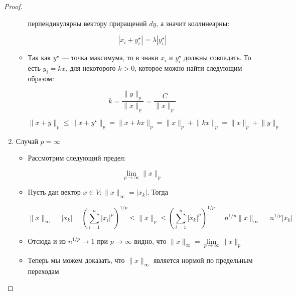\begin{proof}
\begin{enumerate}
\begin{itemize}
                перпендикулярны вектору приращений $dy$, а значит коллинеарны:

                \[
                |x_i + y^{\star}_i| = \lambda |y^{\star}_i|
                \]

                \item Так как $y^{\star}$ --- точка максимума, то в знаки $x_i$ и $y^{\star}_i$ должны совпадать. То есть $y_i = k x_i$ для некоторого $k > 0$, которое можно найти следующим образом:

                \[
                k = \frac{\lVert y \rVert_p}{\lVert x \rVert_p} = \frac{C}{\lVert x \rVert_p}
                \]

                \[
                \lVert x + y \rVert_p \leqslant \lVert x + y^{\star} \rVert_p = \lVert x + kx \rVert_p = \lVert x \rVert_p + \lVert kx \rVert_p = \lVert x \rVert_p + \lVert y \rVert_p
                \]

            \end{itemize}

        \item Случай $p = \infty$

            \begin{itemize}
                \item Рассмотрим следующий предел:

                \[
                \lim\limits_{p \to \infty} \lVert x \rVert_p
                \]

                \item Пусть дан вектор $x \in V: \lVert x \rVert_{\infty} = |x_k|$. Тогда

                \[
                \lVert x \rVert_{\infty} = |x_k| = \left(\sum\limits_{i = 1}^n |x_i|^p\right)^{1/p} \leqslant \lVert x \rVert_p \leqslant \left(\sum\limits_{i = 1}^n |x_k|^p\right)^{1/p} = n^{1/p} \lVert x \rVert_{\infty} = n^{1/p} |x_k|
                \]

                \item Отсюда и из $n^{1/p} \longrightarrow 1$ при $p \longrightarrow \infty$ видно, что $\lVert x \rVert_{\infty} = \lim\limits_{p \to \infty} \lVert x \rVert_p$

                \item Теперь мы можем доказать, что $\lVert x \rVert_{\infty}$ является нормой по предельным переходам
            \end{itemize}
    \end{enumerate}
\end{proof}

